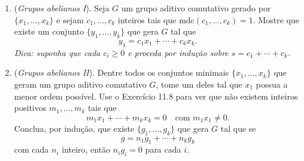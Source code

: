 \documentclass[a4paper,12pt]{article}
\begin{document}
\begin{enumerate}[label=11.\arabic*.]
    \item (\textit{Grupos abelianos I}). Seja $G$ um grupo aditivo comutativo gerado por $\{x_1, \ldots, x_k\}$ e sejam $c_1, \ldots, c_k$ inteiros tais que $\mathrm{mdc}(c_1, \ldots, c_k) = 1$. Mostre que existe um conjunto $\{y_1, \ldots, y_k\}$ que gera $G$ tal que 
    \[
    y_1 = c_1x_1 + \cdots + c_kx_k.
    \] 
    \textit{Dica: suponha que cada $c_i \geq 0$ e proceda por indução sobre $s = c_1 + \cdots + c_k$.}

    \item (\textit{Grupos abelianos II}). Dentre todos os conjuntos minimais $\{x_1, \ldots, x_k\}$ que geram um grupo aditivo comutativo $G$, tome um deles tal que $x_1$ possua a menor ordem possível. Use o Exercício 11.8 para ver que não existem inteiros positivos $m_1, \ldots, m_k$ tais que 
    \[
    m_1x_1 + \cdots + m_kx_k = 0 \quad \text{com } m_1x_1 \neq 0.
    \] 
    Conclua, por indução, que existe $\{g_1, \ldots, g_k\}$ que gera $G$ tal que se 
    \[
    g = n_1 g_1 + \cdots + n_k g_k
    \] 
    com cada $n_i$ inteiro, então $n_i g_i = 0$ para cada $i$.

\end{enumerate}
\end{document}
